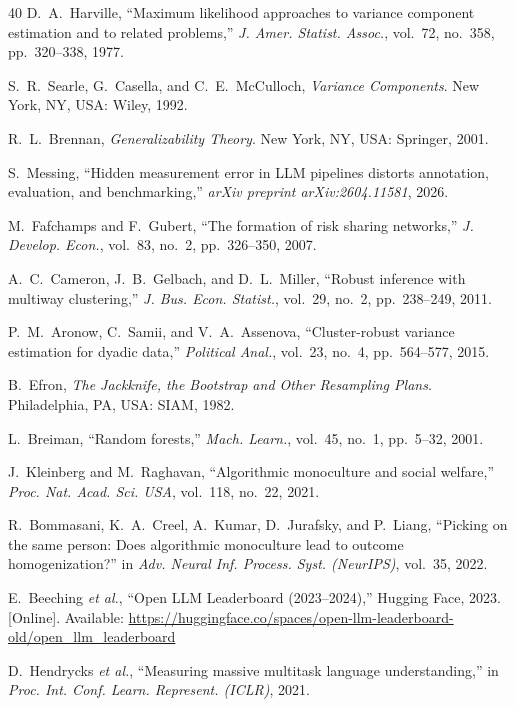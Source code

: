 \documentclass{ieeeaccess}
\theoremstyle{definition}
\theoremstyle{plain}
\begin{document}
\begin{thebibliography}{40}
 D.~A.~Harville, ``Maximum likelihood approaches to variance
component estimation and to related problems,'' \emph{J. Amer. Statist. Assoc.},
vol.~72, no.~358, pp.~320--338, 1977.

 S.~R.~Searle, G.~Casella, and C.~E.~McCulloch,
\emph{Variance Components}. New York, NY, USA: Wiley, 1992.

 R.~L.~Brennan, \emph{Generalizability Theory}. New York, NY,
USA: Springer, 2001.

 S.~Messing, ``Hidden measurement error in LLM pipelines
distorts annotation, evaluation, and benchmarking,'' \emph{arXiv preprint
arXiv:2604.11581}, 2026.

 M.~Fafchamps and F.~Gubert, ``The formation of risk
sharing networks,'' \emph{J. Develop. Econ.}, vol.~83, no.~2, pp.~326--350, 2007.

 A.~C.~Cameron, J.~B.~Gelbach, and D.~L.~Miller, ``Robust
inference with multiway clustering,'' \emph{J. Bus. Econ. Statist.}, vol.~29,
no.~2, pp.~238--249, 2011.

 P.~M.~Aronow, C.~Samii, and V.~A.~Assenova,
``Cluster-robust variance estimation for dyadic data,'' \emph{Political Anal.},
vol.~23, no.~4, pp.~564--577, 2015.

 B.~Efron, \emph{The Jackknife, the Bootstrap and Other
Resampling Plans}. Philadelphia, PA, USA: SIAM, 1982.

 L.~Breiman, ``Random forests,'' \emph{Mach. Learn.},
vol.~45, no.~1, pp.~5--32, 2001.

 J.~Kleinberg and M.~Raghavan, ``Algorithmic monoculture
and social welfare,'' \emph{Proc. Nat. Acad. Sci. USA}, vol.~118, no.~22,
2021.

 R.~Bommasani, K.~A.~Creel, A.~Kumar, D.~Jurafsky, and
P.~Liang, ``Picking on the same person: Does algorithmic monoculture lead to
outcome homogenization?'' in \emph{Adv. Neural Inf. Process. Syst. (NeurIPS)},
vol.~35, 2022.

 E.~Beeching \emph{et al.}, ``Open LLM Leaderboard
(2023--2024),'' Hugging Face, 2023. [Online]. Available:
\url{https://huggingface.co/spaces/open-llm-leaderboard-old/open_llm_leaderboard}

 D.~Hendrycks \emph{et al.}, ``Measuring massive multitask
language understanding,'' in \emph{Proc. Int. Conf. Learn. Represent. (ICLR)},
2021.


\end{thebibliography}
\end{document}
